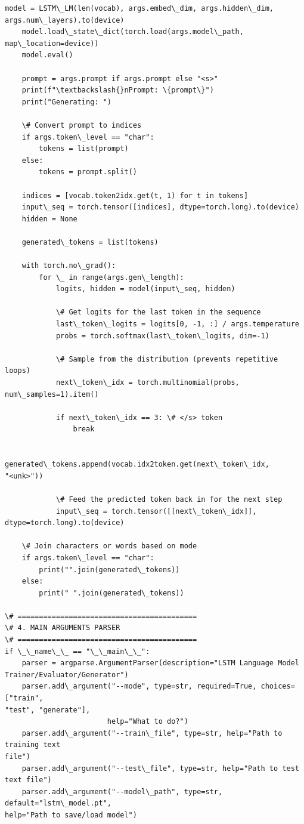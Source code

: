 \documentclass[11pt]{article}
\begin{document}
\begin{Verbatim}[commandchars=\\\{\}]
    model = LSTM\_LM(len(vocab), args.embed\_dim, args.hidden\_dim,
args.num\_layers).to(device)
    model.load\_state\_dict(torch.load(args.model\_path, map\_location=device))
    model.eval()

    prompt = args.prompt if args.prompt else "<s>"
    print(f"\textbackslash{}nPrompt: \{prompt\}")
    print("Generating: ")

    \# Convert prompt to indices
    if args.token\_level == "char":
        tokens = list(prompt)
    else:
        tokens = prompt.split()

    indices = [vocab.token2idx.get(t, 1) for t in tokens]
    input\_seq = torch.tensor([indices], dtype=torch.long).to(device)
    hidden = None

    generated\_tokens = list(tokens)

    with torch.no\_grad():
        for \_ in range(args.gen\_length):
            logits, hidden = model(input\_seq, hidden)

            \# Get logits for the last token in the sequence
            last\_token\_logits = logits[0, -1, :] / args.temperature
            probs = torch.softmax(last\_token\_logits, dim=-1)

            \# Sample from the distribution (prevents repetitive loops)
            next\_token\_idx = torch.multinomial(probs, num\_samples=1).item()

            if next\_token\_idx == 3: \# </s> token
                break

            generated\_tokens.append(vocab.idx2token.get(next\_token\_idx,
"<unk>"))

            \# Feed the predicted token back in for the next step
            input\_seq = torch.tensor([[next\_token\_idx]],
dtype=torch.long).to(device)

    \# Join characters or words based on mode
    if args.token\_level == "char":
        print("".join(generated\_tokens))
    else:
        print(" ".join(generated\_tokens))

\# ==========================================
\# 4. MAIN ARGUMENTS PARSER
\# ==========================================
if \_\_name\_\_ == "\_\_main\_\_":
    parser = argparse.ArgumentParser(description="LSTM Language Model
Trainer/Evaluator/Generator")
    parser.add\_argument("--mode", type=str, required=True, choices=["train",
"test", "generate"],
                        help="What to do?")
    parser.add\_argument("--train\_file", type=str, help="Path to training text
file")
    parser.add\_argument("--test\_file", type=str, help="Path to test text file")
    parser.add\_argument("--model\_path", type=str, default="lstm\_model.pt",
help="Path to save/load model")


\end{Verbatim}
\end{document}

